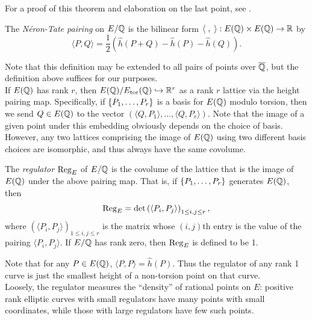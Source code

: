 For a proof of this theorem and elaboration on the last point, see \cite[pp. 227-232]{Sil-1985}.

\begin{definition}
The {\it N\'eron-Tate pairing} on $E/\mathbb{Q}$ is the bilinear form $\langle\;,\;\rangle: E(\mathbb{Q})\times E(\mathbb{Q}) \to \mathbb{R}$ by
	\begin{equation}
		\langle P,Q \rangle = \frac{1}{2}\left(\hat{h}(P+Q) - \hat{h}(P) - \hat{h}(Q)\right).
	\end{equation}
\end{definition}
Note that this definition may be extended to all pairs of points over $\overline{\mathbb{Q}}$, but the definition above suffices for our purposes. \\

If $E(\mathbb{Q})$ has rank $r$, then $E(\mathbb{Q})/E_{\text{tor}}(\mathbb{Q}) \hookrightarrow \mathbb{R}^r$ as a rank $r$ lattice via the height pairing map. Specifically, if $\left\{P_1,\ldots, P_r\right\}$ is a basis for $E(\mathbb{Q})$ modulo torsion, then we send $Q \in E(\mathbb{Q})$ to the vector $\left( \langle Q,P_1 \rangle, \ldots, \langle Q,P_r \rangle \right)$. Note that the image of a given point under this embedding obviously depends on the choice of basis. However, any two lattices comprising the image of $E(\mathbb{Q})$ using two different basis choices are isomorphic, and thus always have the same covolume.

\begin{definition}
The {\it regulator} $\operatorname{Reg}_E$ of $E/\mathbb{Q}$ is the covolume of the lattice that is the image of $E(\mathbb{Q})$ under the above pairing map. That is, if $\left\{P_1,\ldots,P_r\right\}$ generates $E(\mathbb{Q})$, then
\begin{equation}
	\operatorname{Reg}_E = \det\left(\langle P_i,P_j\rangle \right)_{1 \le i,j \le r},
\end{equation}
where $\left(\langle P_i,P_j\rangle \right)_{1 \le i,j \le r}$ is the matrix whose $(i,j)$th entry is the value of the pairing $\langle P_i,P_j\rangle$. If $E/\mathbb{Q}$ has rank zero, then $\operatorname{Reg}_E$ is defined to be 1.
\end{definition}
Note that for any $P \in E(\mathbb{Q})$, $\langle P, P \rangle = \hat{h}(P)$. Thus the regulator of any rank 1 curve is just the smallest height of a non-torsion point on that curve. \\

Loosely, the regulator measures the ``density'' of rational points on $E$: positive rank elliptic curves with small regulators have many points with small coordinates, while those with large regulators have few such points.\\

